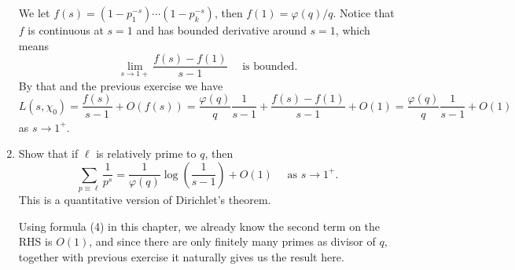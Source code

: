 \documentclass{article}
\begin{document}
\begin{enumerate}
    \begin{solution}
        We let $f(s) = (1-p_1^{-s})\cdots (1-p_k^{-s})$, then $f(1)=\varphi(q)/q$. Notice that $f$ is continuous at $s=1$ and has bounded
        derivative around $s=1$, which means
        $$\lim_{s\to 1+} \dfrac{f(s) - f(1)}{s-1}\quad\text{ is bounded.}$$
        By that and the previous exercise we have
        $$L(s, \chi_0) = \dfrac{f(s)}{s-1} + O(f(s))=\dfrac{\varphi(q)}q \dfrac{1}{s-1} + \dfrac{f(s)-f(1)}{s-1} + O(1)=
            \dfrac{\varphi(q)}q \dfrac{1}{s-1} + O(1)$$
        as $s\to 1^+$.
    \end{solution}
    \item Show that if $\ell$ is relatively prime to $q$, then
    $$\sum_{p\equiv \ell} \dfrac{1}{p^s} = \dfrac1{\varphi(q)}\log\left(\dfrac1{s-1}\right) + O(1) \quad\text{ as } s\to 1^+.$$
    This is a quantitative version of Dirichlet's theorem.

    \begin{solution}
        Using formula (4) in this chapter, we already know the second term on the RHS is $O(1)$, and since there are only finitely many primes as divisor of $q$, together
        with previous exercise it naturally gives us the result here.
    \end{solution}
\end{enumerate}
\end{document}
